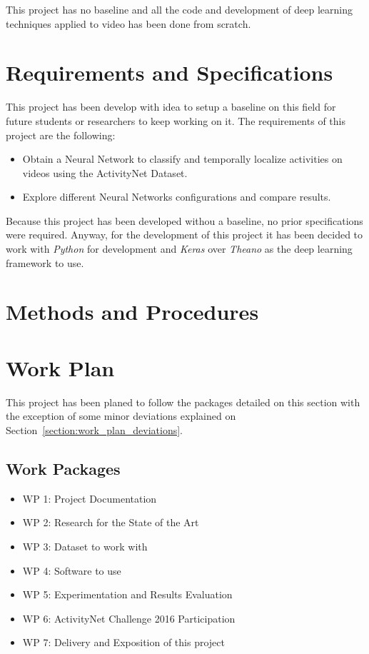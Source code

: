 This project has no baseline and all the code and development of deep learning techniques applied to video has been done from scratch.

\section{Requirements and Specifications}

This project has been develop with idea to setup a baseline on this field for future students or researchers to keep working on it. The requirements of this project are the following:
\begin{itemize}
    \item Obtain a Neural Network to classify and temporally localize activities on videos using the ActivityNet Dataset.
    \item Explore different Neural Networks configurations and compare results.
\end{itemize}

Because this project has been developed withou a baseline, no prior specifications were required. Anyway, for the development of this project it has been decided to work with \textit{Python} for development and \textit{Keras} over \textit{Theano}\cite{theano2016theano} as the deep learning framework to use.

\section{Methods and Procedures}



\section{Work Plan}

This project has been planed to follow the packages detailed on this section with the exception of some minor deviations explained on Section~\ref{section:work_plan_deviations}.

\subsection{Work Packages}

\begin{itemize}
    \item WP 1: Project Documentation
    \item WP 2: Research for the State of the Art
    \item WP 3: Dataset to work with
    \item WP 4: Software to use
    \item WP 5: Experimentation and Results Evaluation
    \item WP 6: ActivityNet Challenge 2016 Participation
    \item WP 7: Delivery and Exposition of this project
\end{itemize}

